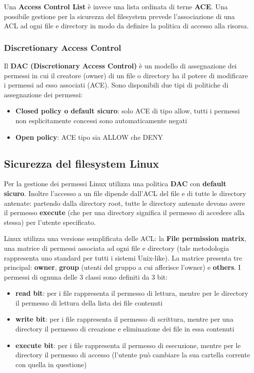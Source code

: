 Una \textbf{Access Control List} è invece una lista ordinata di terne \textbf{ACE}. Una possibile gestione per la sicurezza del filesystem prevede l'associazione di una ACL ad ogni file e directory in modo da definire la politica di accesso alla risorsa.

\subsubsection{Discretionary Access Control}
Il \textbf{DAC (Discretionary Access Control)} è un modello di assegnazione dei permessi in cui il creatore (owner) di un file o directory ha il potere di modificare i permessi ad esso associati (ACE). Sono disponibili due tipi di politiche di assegnazione dei permessi:
\begin{itemize}
  \item \textbf{Closed policy o default sicuro}: solo ACE di tipo allow, tutti i permessi non esplicitamente concessi sono automaticamente negati
  \item \textbf{Open policy}: ACE tipo sia ALLOW che DENY
\end{itemize}

\subsection{Sicurezza del filesystem Linux}
Per la gestione dei permessi Linux utilizza una politica \textbf{DAC} con \textbf{default sicuro}. Inoltre l'accesso a un file dipende dall'ACL del file e di tutte le directory antenate: partendo dalla directory root, tutte le directory antenate devono avere il permesso \textbf{execute} (che per una directory significa il permesso di accedere alla stessa) per l'utente specificato. \newline

Linux utilizza una versione semplificata delle ACL: la \textbf{File permission matrix}, una matrice di permessi associata ad ogni file e directory (tale metodologia rappresenta uno standard per tutti i sistemi Unix-like). La matrice presenta tre principal: \textbf{owner}, \textbf{group} (utenti del gruppo a cui afferisce l'owner) e \textbf{others}. I permessi di ognuna delle 3 classi sono definiti da 3 bit:
\begin{itemize}
  \item \textbf{read bit}: per i file rappresenta il permesso di lettura, mentre per le directory il permesso di lettura della lista dei file contenuti
  \item \textbf{write bit}: per i file rappresenta il permesso di scrittura, mentre per una directory il permesso di creazione e eliminazione dei file in essa contenuti
  \item \textbf{execute bit}: per i file rappresenta il permesso di esecuzione, mentre per le directory il permesso di accesso (l'utente può cambiare la sua cartella corrente con quella in questione)
\end{itemize}

